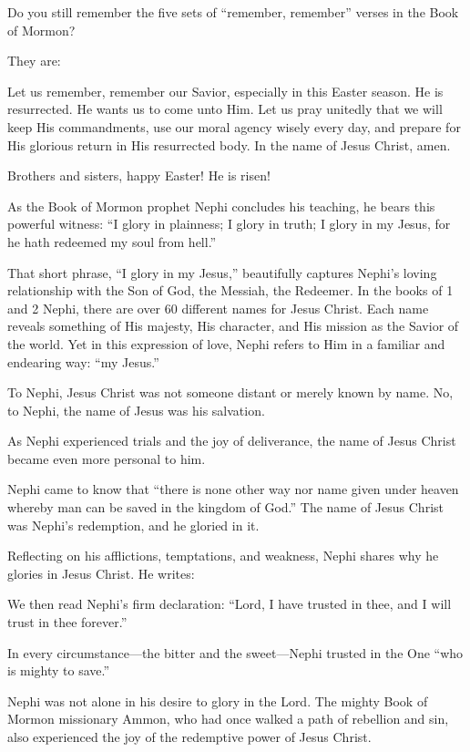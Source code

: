 \documentclass[letterpaper, 11pt]{report}
\newcommand{\speaker}{}
\newcommand{\talk}{}
\newcommand{\talkdatestr}{}
\newcommand{\setspeaker}[1]{\renewcommand{\speaker}{#1}}
\newcommand{\settalk}[1]{\renewcommand{\talk}{#1}}
\newcommand{\talkheading}[2]{%
    \vspace{1em}
    \noindent{\huge\bfseries #1}
    \par\nopagebreak\vspace{0.25em}
    \noindent{\normalsize\bfseries #2\ifx\talkdatestr\empty\else,\ \talkdatestr\fi}
    \par\nopagebreak\vspace{0.5em}
}
\begin{document}
Do you still remember the five sets of “remember, remember” verses in the Book of Mormon?

They are:

Let us remember, remember our Savior, especially in this Easter season. He is resurrected. He wants us to come unto Him. Let us pray unitedly that we will keep His commandments, use our moral agency wisely every day, and prepare for His glorious return in His resurrected body. In the name of Jesus Christ, amen.

\newpage
\settalk{I Glory in My Jesus}
\setspeaker{Aaron T. Hall}
\talkheading{I Glory in My Jesus}{Aaron T. Hall}

Brothers and sisters, happy Easter! He is risen!

As the Book of Mormon prophet Nephi concludes his teaching, he bears this powerful witness: “I glory in plainness; I glory in truth; I glory in my Jesus, for he hath redeemed my soul from hell.”

That short phrase, “I glory in my Jesus,” beautifully captures Nephi’s loving relationship with the Son of God, the Messiah, the Redeemer. In the books of 1 and 2 Nephi, there are over 60 different names for Jesus Christ. Each name reveals something of His majesty, His character, and His mission as the Savior of the world. Yet in this expression of love, Nephi refers to Him in a familiar and endearing way: “my Jesus.”

To Nephi, Jesus Christ was not someone distant or merely known by name. No, to Nephi, the name of Jesus was his salvation.

As Nephi experienced trials and the joy of deliverance, the name of Jesus Christ became even more personal to him.

Nephi came to know that “there is none other way nor name given under heaven whereby man can be saved in the kingdom of God.” The name of Jesus Christ was Nephi’s redemption, and he gloried in it.

Reflecting on his afflictions, temptations, and weakness, Nephi shares why he glories in Jesus Christ. He writes:

We then read Nephi’s firm declaration: “Lord, I have trusted in thee, and I will trust in thee forever.”

In every circumstance—the bitter and the sweet—Nephi trusted in the One “who is mighty to save.”

Nephi was not alone in his desire to glory in the Lord. The mighty Book of Mormon missionary Ammon, who had once walked a path of rebellion and sin, also experienced the joy of the redemptive power of Jesus Christ.
\end{document}
